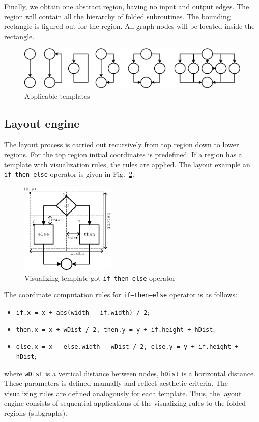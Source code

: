\documentclass[conference]{IEEEtran}
\begin{document}
Finally, we obtain one abstract region, having no input and output edges.  The region will contain all the hierarchy of folded subroutines.  The bounding rectangle is figured out for the region.  All graph nodes will be located inside the rectangle.

\begin{figure}[htbp]
	\centering
		\includegraphics[width=1\textwidth]{Pic/Reg.eps}
	\caption{Applicable templates}
	\label{fig:Regions}
\end{figure}

\subsection{Layout engine}
\label{sec:raskladka-process}

The layout process is carried out recursively from top region down to lower regions.  For the top region initial coordinates is predefined.  If a region has a template with visualization rules, the rules are applied.  The layout example an \texttt{if--then--else} operator is given in Fig.~\ref{fig:IfThenElse}.

\begin{figure}[htbp]
	\centering
		\includegraphics[width=0.4\textwidth]{Pic/IfThenElse.eps}
	\caption{Visualizing template got \texttt{if-then-else} operator}
	\label{fig:IfThenElse}
\end{figure}

The coordinate computation rules for \texttt{if--then--else} operator is as follows:
\begin{itemize}
\item \texttt{if.x = x + abs(width - if.width) / 2};
\item \texttt{then.x = x  + wDist / 2, then.y = y + if.height + hDist};
\item \texttt{else.x = x - else.width - wDist / 2, else.y = y + if.height + hDist};
\end{itemize}
where \texttt{wDist} is a vertical distance between nodes, \texttt{hDist} is a horizontal distance.  These parameters is defined manually and reflect aesthetic criteria.  The visualizing rules are defined analogously for each template.  Thus, the layout engine consists of sequential applications of the visualizing rules to the folded regions (subgraphs).
\end{document}
